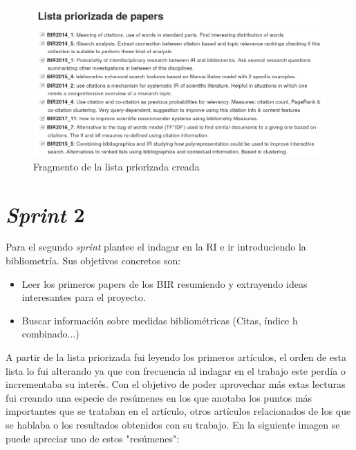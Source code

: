 \begin{figure}[ht]
	
	\centering
	\includegraphics[width=\linewidth]{imagenes/lista_priorizada}
	\caption{Fragmento de la lista priorizada creada}
\end{figure}

\section{\textit{Sprint} 2}
Para el segundo \textit{sprint} plantee el indagar en la \acrshort{RI} e ir introduciendo la bibliometría. Sus objetivos concretos son: 

\begin{itemize}
	\item Leer los primeros papers de los \acrshort{BIR} resumiendo y extrayendo ideas interesantes para el proyecto.
	\item Buscar información sobre medidas bibliométricas (Citas, índice h combinado...)
\end{itemize}

A partir de la lista priorizada fui leyendo los primeros artículos, el orden de esta lista lo fui alterando ya que con frecuencia al indagar en el trabajo este perdía o incrementaba su interés. Con el objetivo de poder aprovechar más estas lecturas fui creando una especie de resúmenes en los que anotaba los puntos más importantes que se trataban en el artículo, otros artículos relacionados de los que se hablaba o los resultados obtenidos con su trabajo. En la siguiente imagen se puede apreciar uno de estos "resúmenes":

